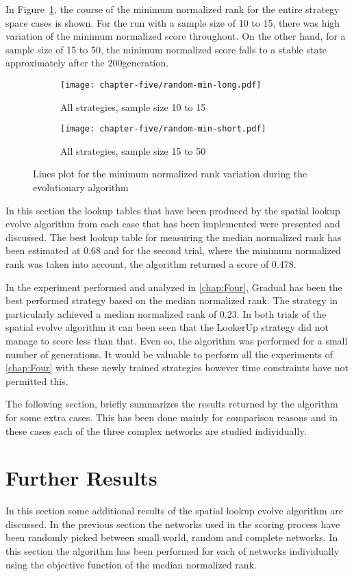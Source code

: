 In Figure~\ref{fig:line-plot-min}, the course of the minimum normalized rank
for the entire strategy space cases is shown. For the run with a sample size of 10 to 15, there was
high variation of the minimum normalized score throughout. On the other hand, for a sample
size of 15 to 50, the minimum normalized score falls to a stable state approximately
after the 200\nth generation.

\begin{figure}[H]
	\centering
	\begin{subfigure}[H]{0.45\textwidth}
		\centering
		\texttt{[image: chapter-five/random-min-long.pdf]}
		\caption{All strategies, sample size 10 to 15}
	\end{subfigure}
  \hfill
  \begin{subfigure}[H]{0.45\textwidth}
    \centering
    \texttt{[image: chapter-five/random-min-short.pdf]}
    \caption{All strategies, sample size 15 to 50}
  \end{subfigure}
	\caption{Lines plot for the minimum normalized rank variation during the
          evolutionary algorithm}
	\label{fig:line-plot-min}
\end{figure}

In this section the lookup tables that have been produced by the spatial lookup
evolve algorithm from each case that has been implemented were presented and discussed.
The best lookup table for measuring the median normalized rank has been estimated
at 0.68 and for the second trial, where the minimum normalized rank was taken into
account, the algorithm returned a score of 0.478.

In the experiment performed and analyzed in \autoref{chap:Four}, Gradual has been
the best performed strategy based on the median normalized rank. The strategy in
particularly achieved a median normalized rank of 0.23. In both trials of the
spatial evolve algorithm it can been seen that the LookerUp strategy did not
manage to score less than that. Even so, the algorithm was performed for a small
number of generations. It would be valuable to perform all the experiments of
\autoref{chap:Four} with these newly trained strategies however time constraints have not
permitted this.

The following section, briefly summarizes the results returned by the algorithm
for some extra cases. This has been done mainly for comparison reasons
and in these cases each of the three complex networks are studied individually.

\section{Further Results}
\label{sub:futher-results}
In this section some additional results of the spatial lookup evolve algorithm
are discussed. In the previous section the networks used in the scoring process
have been randomly picked between small world, random and complete networks.
In this section the algorithm has been performed for each of networks individually
using the objective function of the median normalized rank.

